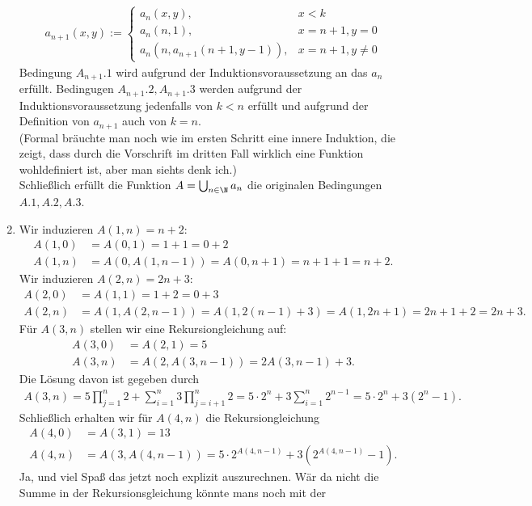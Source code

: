 \begin{solution}
\begin{enumerate}[label = (\alph*)]
\begin{align*}
		a_{n+1}(x,y) := \begin{cases}
			a_n(x,y), & x < k \\
			a_n(n,1), & x = n + 1, y = 0 \\
			a_n(n,a_{n+1}(n+1, y - 1)), & x = n + 1, y \neq 0
		\end{cases}
	\end{align*}
	Bedingung $A_{n+1}.1$ wird aufgrund der Induktionsvoraussetzung an das $a_n$ erfüllt.
	Bedingugen $A_{n+1}.2, A_{n+1}.3$ werden aufgrund der Induktionsvoraussetzung
	jedenfalls von $k < n$ erfüllt und aufgrund der Definition von $a_{n+1}$
	auch von $k = n$. \\
	(Formal bräuchte man noch wie im ersten Schritt eine innere Induktion, die
	zeigt, dass durch die Vorschrift im dritten Fall wirklich eine Funktion
	wohldefiniert ist, aber man siehts denk ich.) \\
	Schließlich erfüllt die Funktion $A = \bigcup_{n \in \N}a_n$ die originalen
	Bedingungen $A.1,A.2,A.3$.
	\item Wir induzieren $A(1,n) = n + 2$:
	\begin{align*}
		A(1,0) &= A(0,1) = 1 + 1 = 0 + 2 \\
		A(1,n) &= A(0,A(1,n-1)) = A(0,n+1) = n + 1 + 1 = n + 2.
	\end{align*}
	Wir induzieren $A(2,n) = 2n + 3$:
	\begin{align*}
		A(2,0) &= A(1,1) = 1 + 2 = 0 + 3 \\
		A(2,n) &= A(1,A(2,n-1)) = A(1,2(n-1) + 3) = A(1, 2n + 1) = 2n + 1 + 2 = 2n + 3.
	\end{align*}
	Für $A(3,n)$ stellen wir eine Rekursiongleichung auf:
	\begin{align*}
		A(3,0) &= A(2,1) = 5 \\
		A(3,n) &= A(2,A(3,n-1)) = 2A(3,n-1) + 3.
	\end{align*}
	Die Lösung davon ist gegeben durch
	\begin{align*}
		A(3,n) = 5\prod_{j=1}^n2 + \sum_{i=1}^n3\prod_{j=i+1}^n2 = 5\cdot2^n + 3\sum_{i=1}^n 2^{n-1}
		= 5\cdot2^n + 3(2^n - 1).
	\end{align*}
	Schließlich erhalten wir für $A(4,n)$ die Rekursiongleichung
	\begin{align*}
		A(4,0) &= A(3,1) = 13 \\
		A(4,n) &= A(3,A(4,n-1)) = 5\cdot2^{A(4,n-1)} + 3(2^{A(4,n-1)} - 1).
	\end{align*}
	Ja, und viel Spaß das jetzt noch explizit auszurechnen.
	Wär da nicht die Summe in der Rekursionsgleichung könnte mans noch mit der

\end{enumerate}
\end{solution}
